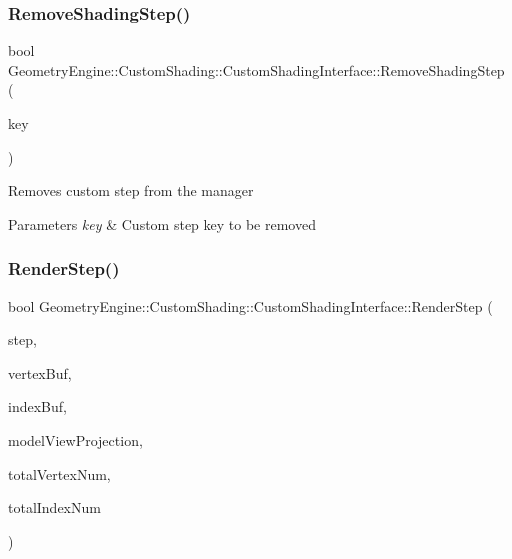 \subsubsection{\texorpdfstring{RemoveShadingStep()}{RemoveShadingStep()}}
{\footnotesize\ttfamily bool Geometry\+Engine\+::\+Custom\+Shading\+::\+Custom\+Shading\+Interface\+::\+Remove\+Shading\+Step (\begin{DoxyParamCaption}\item[{\mbox{\hyperlink{namespace_geometry_engine_1_1_custom_shading_a2dc236a5b567da5099069ce2b2be5609}{Custom\+Shading\+Steps}}}]{key }\end{DoxyParamCaption})}

Removes custom step from the manager 
\begin{DoxyParams}{Parameters}
{\em key} & Custom step key to be removed \\
\hline
\end{DoxyParams}
\mbox{\label{class_geometry_engine_1_1_custom_shading_1_1_custom_shading_interface_a78a7ebc766069eb80ee641b5765445dd}} 
\subsubsection{\texorpdfstring{RenderStep()}{RenderStep()}}
{\footnotesize\ttfamily bool Geometry\+Engine\+::\+Custom\+Shading\+::\+Custom\+Shading\+Interface\+::\+Render\+Step (\begin{DoxyParamCaption}\item[{\mbox{\hyperlink{namespace_geometry_engine_1_1_custom_shading_a2dc236a5b567da5099069ce2b2be5609}{Custom\+Shading\+Steps}}}]{step,  }\item[{Q\+Open\+G\+L\+Buffer $\ast$}]{vertex\+Buf,  }\item[{Q\+Open\+G\+L\+Buffer $\ast$}]{index\+Buf,  }\item[{const Q\+Matrix4x4 \&}]{model\+View\+Projection,  }\item[{unsigned int}]{total\+Vertex\+Num,  }\item[{unsigned int}]{total\+Index\+Num }\end{DoxyParamCaption})\hspace{0.3cm}{\ttfamily [virtual]}}

